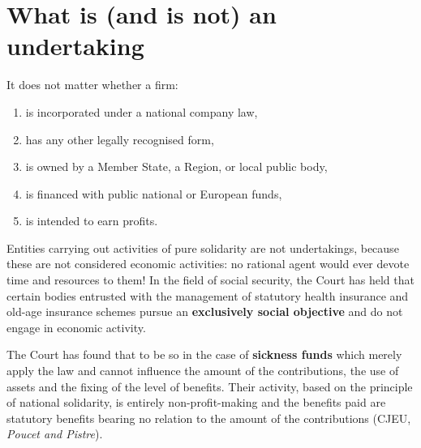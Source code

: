 
\section{What is (and is not) an undertaking}

    It does not matter whether a firm:
    \begin{enumerate}
        \item is incorporated under a national company law,
        \item has any other legally recognised form,
        \item is owned by a Member State, a Region, or local public body,
        \item is financed with public national or European funds,
        \item is intended to earn profits.
    \end{enumerate}


    Entities carrying out activities of pure solidarity are not undertakings, because these are not considered economic activities: no rational agent would ever devote time and resources to them! In the field of social security, the Court has held that certain bodies entrusted with the management of statutory health insurance and old-age insurance schemes pursue an \textbf{exclusively social objective} and do not engage in economic activity. 
    
    The Court has found that to be so in the case of \textbf{sickness funds} which merely apply the law and cannot influence the amount of the contributions, the use of assets and the fixing of the level of benefits. Their activity, based on the principle of national solidarity, is entirely non-profit-making and the benefits paid are statutory benefits bearing no relation to the amount of the contributions (CJEU, \textit{Poucet and Pistre}).

